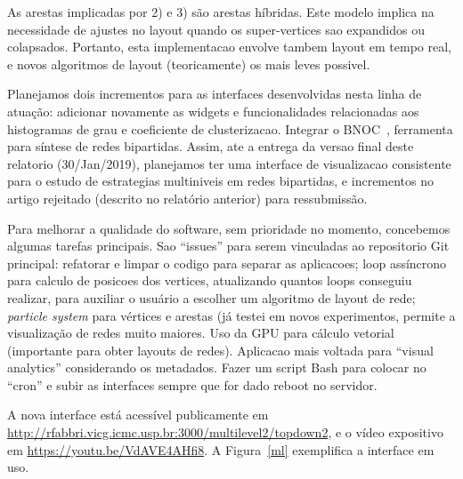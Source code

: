\documentclass[a4paper, 11pt]{article}
\begin{document}
As arestas implicadas por 2) e 3) são arestas híbridas.
Este modelo implica na necessidade de ajustes no layout quando
os super-vertices sao expandidos ou colapsados.
Portanto, esta implementacao envolve tambem layout em tempo real,
e novos algoritmos de layout (teoricamente) os mais leves possivel.

Planejamos dois incrementos para as interfaces desenvolvidas nesta linha de atuação:
adicionar novamente as widgets e funcionalidades relacionadas aos histogramas
de grau e coeficiente de clusterizacao.
Integrar o BNOC~\cite{bnoc}, ferramenta para síntese de redes bipartidas.
Assim, ate a entrega da versao final deste relatorio (30/Jan/2019),
planejamos ter uma interface de visualizacao consistente para o estudo de estrategias
multiniveis em redes bipartidas, e incrementos no artigo rejeitado (descrito no relatório anterior)
para ressubmissão.

Para melhorar a qualidade do software, sem prioridade no momento,
concebemos algumas tarefas principais.
Sao ``issues'' para serem vinculadas ao repositorio Git principal:
refatorar e limpar o codigo para separar as aplicacoes;
loop assíncrono para calculo de posicoes dos vertices,
atualizando quantos loops conseguiu realizar, para auxiliar o usuário a escolher um algoritmo de layout de rede;
\emph{particle system} para vértices e arestas (já testei em novos experimentos, permite a visualização de redes muito maiores. Uso da GPU para cálculo vetorial (importante para obter layouts de redes).  Aplicacao mais voltada para ``visual analytics'' considerando os metadados. Fazer um script Bash para colocar no ``cron'' e subir as interfaces sempre que for dado reboot no servidor.

    A nova interface está acessível publicamente em \url{http://rfabbri.vicg.icmc.usp.br:3000/multilevel2/topdown2}, e o vídeo expositivo em \url{https://youtu.be/VdAVE4AHfi8}.
    A Figura~\ref{ml} exemplifica a interface em uso.
\end{document}
